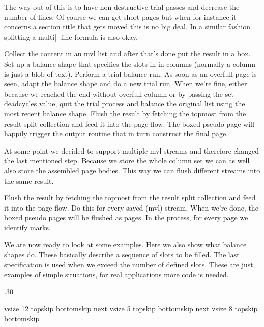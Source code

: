 The way out of this is to have non destructive trial passes and decrease the
number of lines. Of course we can get short pages but when for instance it
concerns a section title that gets moved this is no big deal. In a similar
fashion splitting a multi|-|line formula is also okay.

\startitemize
\startitem
    Collect the content in an mvl list and after that's done put the result in a
    box.
\stopitem
\startitem
    Set up a balance shape that specifies the slots in in columns (normally a
    column is just a blob of text).
\stopitem
\startitem
    Perform a trial balance run. As soon as an overfull page is seen, adapt the
    balance shape and do a new trial run.
\stopitem
\startitem
    When we're fine, either because we reached the end without overfull column or
    by passing the set deadcycles value, quit the trial process and balance the
    original list using the most recent balance shape.
\stopitem
\startitem
    Flush the result by fetching the topmost from the result split collection and
    feed it into the page flow. The boxed pseudo page will happily trigger the
    output routine that in turn construct the final page.
\stopitem
\stopitemize

At some point we decided to support multiple mvl streams and therefore changed
the last mentioned step. Because we store the whole column set we can as well
also store the assembled page bodies. This way we can flush different streams into
the same result.

\startitemize
\startitem
    Flush the result by fetching the topmost from the result split collection and
    feed it into the page flow. Do this for every saved (mvl) stream.
\stopitem
\startitem
    When we're done, the boxed pseudo pages will be flushed as pages. In the
    process, for every page we identify marks.
\stopitem
\stopitemize

We are now ready to look at some examples. Here we also show what balance shapes
do. These basically describe a sequence of slots to be filled. The last
specification is used when we exceed the number of defined slots. These are just
examples of simple situations, for real applications more code is needed.

\startbuffer[one]
\setbox\scratchboxone\vbox\bgroup
    \hsize.30\hsize
\egroup
\stopbuffer

\startbuffer[two]
    vsize      12\lineheight
    topskip    \strutht
    bottomskip \strutdp
next
    vsize      5\lineheight
    topskip    \strutht
    bottomskip \strutdp
next
    vsize      8\lineheight
    topskip    \strutht
    bottomskip \strutdp
\relax
\stopbuffer

